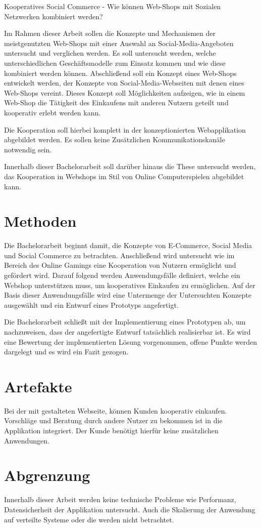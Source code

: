 Kooperatives Social Commerce
- Wie können Web-Shops mit Sozialen Netzwerken kombiniert werden?

Im Rahmen dieser Arbeit sollen die Konzepte und Mechanismen der meistgenutzten Web-Shops mit einer Auswahl an Social-Media-Angeboten untersucht und verglichen werden. Es soll untersucht werden, welche unterschiedlichen Geschäftsmodelle zum Einsatz kommen und wie diese kombiniert werden können. Abschließend soll ein Konzept eines Web-Shops entwickelt werden, der Konzepte von Social-Media-Webseiten mit denen eines Web-Shops vereint. Dieses Konzept soll Möglichkeiten aufzeigen, wie in einem Web-Shop die Tätigkeit des Einkaufens mit anderen Nutzern geteilt und kooperativ erlebt werden kann.

Die Kooperation soll hierbei komplett in der konzeptionierten Webapplikation abgebildet werden. Es sollen keine Zusätzlichen Kommunikationskanäle notwendig sein.

Innerhalb dieser Bachelorarbeit soll darüber hinaus die These untersucht werden, das Kooperation in Webshops im Stil von Online Computerspielen abgebildet kann.


\section{Methoden}

Die Bachelorarbeit beginnt damit, die Konzepte von E-Commerce, Social Media und Social Commerce zu betrachten. Anschließend wird untersucht wie im Bereich des Online Gamings eine Kooperation von Nutzern ermöglicht und gefördert wird. Darauf folgend werden Anwendungsfälle definiert, welche ein Webshop unterstützen muss, um kooperatives Einkaufen zu ermöglichen. Auf der Basis dieser Anwendungsfälle wird eine Untermenge der Untersuchten Konzepte ausgewählt und ein Entwurf eines Prototyps angefertigt.

Die Bachelorarbeit schließt mit der Implementierung eines Prototypen ab, um nachzuweisen, dass der angefertigte Entwurf tatsächlich realisierbar ist. Es wird eine Bewertung der implementierten Lösung vorgenommen, offene Punkte werden dargelegt und es wird ein Fazit gezogen.


\section{Artefakte}

Bei der mit  gestalteten Webseite, können Kunden kooperativ einkaufen. Vorschläge und Beratung durch andere Nutzer zu bekommen ist in die Applikation integriert. Der Kunde benötigt hierfür keine zusätzlichen Anwendungen.


\section{Abgrenzung}

Innerhalb dieser Arbeit werden keine technische Probleme wie Performanz, Datensicherheit der Applikation untersucht. Auch die Skalierung der Anwendung auf verteilte Systeme oder die  werden nicht betrachtet.
